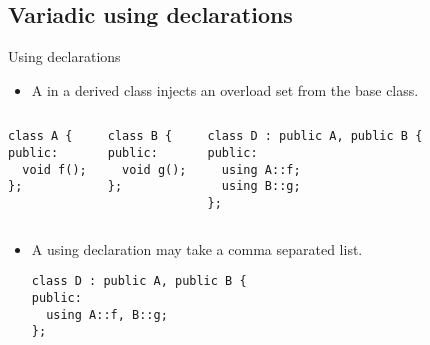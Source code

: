 \subsection{Variadic using declarations}

\begin{frame}[t,fragile]{Using declarations}
\begin{itemize}
  \item A  in a derived class 
        injects an overload set from the base class.
\end{itemize}

\begin{columns}[T]
\begin{lstlisting}
class A {
public:
  void f();
};
\end{lstlisting}

\begin{lstlisting}
class B {
public:
  void g();
};
\end{lstlisting}

\begin{lstlisting}
class D : public A, public B {
public:
  using A::f;
  using B::g;
};
\end{lstlisting}

\end{columns}

\begin{itemize}
  \item A using declaration may take a comma separated list.
\begin{lstlisting}
class D : public A, public B {
public:
  using A::f, B::g;
};
\end{lstlisting}
\end{itemize}
\end{frame}

